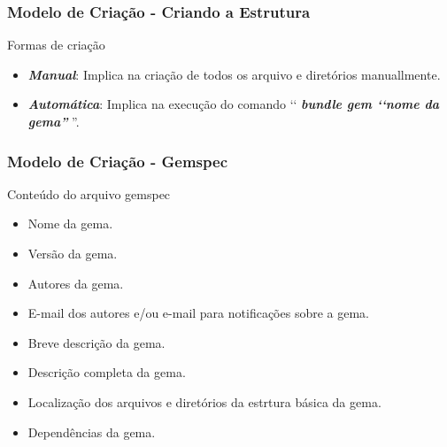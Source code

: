 \begin{frame}
\frametitle{Modelo de Criação - Criando a Estrutura}

  \begin{block}{Formas de criação}

   \begin{itemize}

    \item \emph{\textbf{Manual}}: Implica na criação de todos os arquivo e diretórios manuallmente.

    \item \emph{\textbf{Automática}}: Implica na execução do comando 
    ‘‘ \emph{\textbf{bundle gem ‘‘nome da gema''}} ''.

   \end{itemize}

  \end{block}

\end{frame}


\begin{frame}
\frametitle{Modelo de Criação - Gemspec}

  \begin{block}{Conteúdo do arquivo gemspec}

   \begin{itemize}

    \item Nome da gema.

    \item Versão da gema.

    \item Autores da gema.

    \item E-mail dos autores e/ou e-mail para notificações sobre a gema.

    \item Breve descrição da gema.

    \item Descrição completa da gema.

    \item Localização dos arquivos e diretórios da estrtura básica da gema.

    \item Dependências da gema.

   \end{itemize}

  \end{block}

\end{frame}


